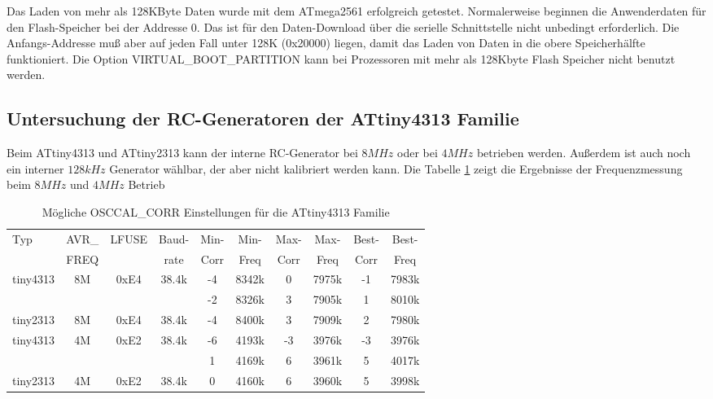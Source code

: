 Das Laden von mehr als 128KByte Daten wurde mit dem ATmega2561 erfolgreich getestet.
Normalerweise beginnen die Anwenderdaten für den Flash-Speicher bei der Addresse 0.
Das ist für den Daten-Download über die serielle Schnittstelle nicht unbedingt erforderlich.
Die Anfangs-Addresse muß aber auf jeden Fall unter 128K (0x20000) liegen, 
damit das Laden von Daten in die obere Speicherhälfte funktioniert.
Die Option VIRTUAL\_BOOT\_PARTITION kann bei Prozessoren mit mehr
als 128Kbyte Flash Speicher nicht benutzt werden.

\subsection{Untersuchung der RC-Generatoren der ATtiny4313 Familie}

Beim ATtiny4313 und ATtiny2313 kann der interne RC-Generator bei \(8MHz\) oder
bei \(4MHz\) betrieben werden. Außerdem ist auch noch ein interner \(128kHz\) Generator
wählbar, der aber nicht kalibriert werden kann.
Die Tabelle \ref{tab:tiny4313freq} zeigt die Ergebnisse der Frequenzmessung beim
\(8MHz\) und \(4MHz\) Betrieb

\begin{table}[H]
  \begin{center}
    \begin{tabular}{| l | c | c | c || c | c || c | c || c | c |}
    \hline
   Typ  &       AVR\_ & LFUSE & Baud- & Min- & Min- & Max- & Max- & Best- & Best-  \\
        &       FREQ  &       & rate & Corr & Freq & Corr & Freq  & Corr  & Freq  \\
    \hline
    \hline
tiny4313 &         8M & 0xE4  & 38.4k &  -4  & 8342k & 0  & 7975k  & -1  & 7983k \\
         &            &       &       &  -2  & 8326k & 3  & 7905k  & 1  & 8010k \\
    \hline
tiny2313 &         8M & 0xE4  & 38.4k &  -4  & 8400k & 3  & 7909k  &  2  & 7980k \\
    \hline
tiny4313 &         4M & 0xE2  & 38.4k &  -6  & 4193k & -3  & 3976k  & -3  & 3976k \\
         &            &       &       &   1  & 4169k & 6  & 3961k  & 5  & 4017k \\
    \hline
tiny2313 &         4M & 0xE2  & 38.4k &   0  & 4160k & 6  & 3960k  &  5  & 3998k \\
    \hline
    \end{tabular}
  \end{center}
  \caption{Mögliche OSCCAL\_CORR Einstellungen für die ATtiny4313 Familie}
  \label{tab:tiny4313freq}
\end{table}

